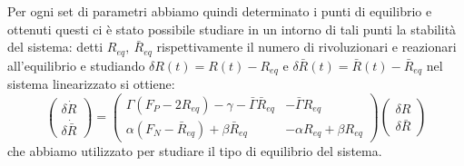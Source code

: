 Per ogni set di parametri abbiamo quindi determinato i punti di equilibrio e ottenuti questi ci è stato possibile studiare in un intorno di tali punti la stabilità del sistema: detti $R_{eq},\ \bar{R}_{eq}$ rispettivamente il numero di rivoluzionari e reazionari all'equilibrio e studiando $\delta R(t)=R(t)- R_{eq}$ e $\delta \bar{R}(t)=\bar{R}(t)-\bar R_{eq}$ nel sistema linearizzato si ottiene:
\begin{equation}
	\begin{pmatrix}
		\delta \dot{R}\\ 
		\delta \dot{\bar{R}}
	\end{pmatrix}
	=\begin{pmatrix}
		\Gamma(F_P-2R_{eq})-\gamma-\bar{\Gamma} \bar{R}_{eq} & -\bar{\Gamma}R_{eq}\\
		\alpha(F_{N}-\bar{R}_{eq})+\beta \bar{R}_{eq} & -\alpha R_{eq}+\beta R_{eq}
	\end{pmatrix}
	\begin{pmatrix}
		\delta R\\
		\delta \bar{R}
	\end{pmatrix}
\end{equation} 
che abbiamo utilizzato per studiare il tipo di equilibrio del sistema.
